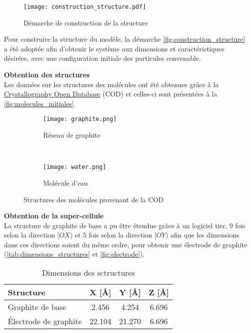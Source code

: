 \begin{figure}[h!]
    \centering
    \texttt{[image: construction\_structure.pdf]}
    \caption{Démarche de construction de la structure}
    \label{fig:construction_structure}
\end{figure}

Pour construire la structure du modèle, la démarche \autoref{fig:construction_structure} a été adoptée afin d'obtenir le système aux dimensions et caractéristiques désirées, avec une configuration initiale des particules convenable.

\textbf{Obtention des structures}\\
Les données sur les structures des molécules ont été obtenues grâce à la \href{http://www.crystallography.net/cod/}{Crystallography Open Database} (COD) et celles-ci sont présentées à la \autoref{fig:molecules_initiales}.

\begin{figure}[h!]
	\centering
	\begin{subfigure}[t]{.49\textwidth}
		\centering
		\texttt{[image: graphite.png]}
		\caption{Réseau de graphite}
	\end{subfigure}%
    ~
	\begin{subfigure}[t]{.49\textwidth}
		\centering
		\texttt{[image: water.png]}
		\caption{Molécule d'eau}
	\end{subfigure}
	\caption{Structures des molécules provenant de la COD}
	\label{fig:molecules_initiales}
\end{figure}

\textbf{Obtention de la super-cellule}\\
La structure de graphite de base a pu être étendue grâce à un logiciel tier\cite{momma_vesta_2011}, \num{9} fois selon la direction $[OX)$ et \num{5} fois selon la direction $[OY)$ afin que les dimensions dans ces directions soient du même ordre, pour obtenir une électrode de graphite (\autoref{tab:dimensions_structures} et \autoref{fig:electrode}).

\begin{table}[h!]
    \centering
    \begin{tabular}{l | c c c}
        \hline
        Structure &X [Å] &Y [Å] &Z [Å]\\
        \hline
        Graphite de base &\num{2.456} &\num{4.254} &\num{6.696}\\
        Électrode de graphite &\num{22.104} &\num{21.270} &\num{6.696}\\
        \hline
    \end{tabular}
    \caption{Dimensions des sctructures}
    \label{tab:dimensions_structures}
\end{table}

